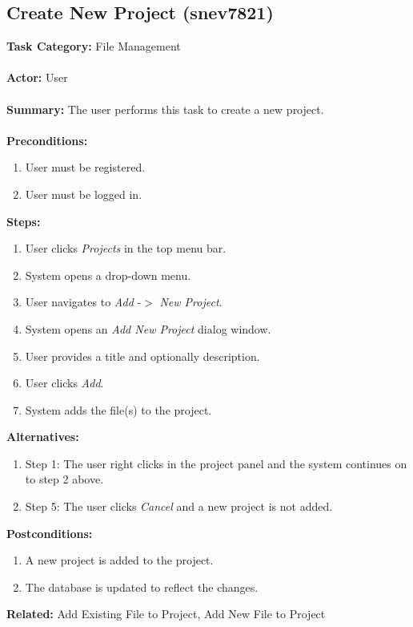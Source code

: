 \documentclass[11pt]{report}
\begin{document}
\subsection{Create New Project (snev7821)}
\begin{framed}

	\textbf{Task Category:} File Management \\ \\
	\textbf{Actor:} User \\ \\
	\textbf{Summary:} The user performs this task to create a new project. \\ \\
	\textbf{Preconditions:} 
	\begin{enumerate}
		\item User must be registered.
		\item User must be logged in.
	\end{enumerate}
	\textbf{Steps:}
	\begin{enumerate}
		\item User clicks \textit{Projects} in the top menu bar.
		\item System opens a drop-down menu.
		\item User navigates to \textit{Add} -$>$ \textit{New Project}.
		\item System opens an \textit{Add New Project} dialog window.
		\item User provides a title and optionally description.
		\item User clicks \textit{Add}.
		\item System adds the file(s) to the project.
	\end{enumerate}
	\textbf{Alternatives:} 
	\begin{enumerate}
		\item Step 1: The user right clicks in the project panel and the system continues on to step 2 above.
		\item Step 5: The user clicks \textit{Cancel} and a new project is not added.
	\end{enumerate}
	\textbf{Postconditions:}
	\begin{enumerate}
		\item A new project is added to the project.
		\item The database is updated to reflect the changes.
	\end{enumerate}
	\textbf{Related:} Add Existing File to Project, Add New File to Project
\end{framed} 
\end{document}

